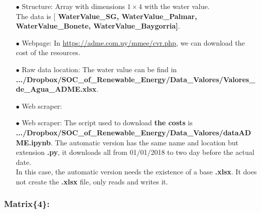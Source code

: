 \documentclass[12pt]{article}
\theoremstyle{definition}
\theoremstyle{remark}
\begin{document}
\begin{enumerate}

\item[$\bullet$] Structure: Array with dimensions $1\times4$ with the water value.\\
The data is [\textbf{{\color{blue} WaterValue\_SG, WaterValue\_Palmar, WaterValue\_Bonete, WaterValue\_Baygorria}]}.

\item[$\bullet$] Webpage: In {\color{blue} \url{https://adme.com.uy/mmee/cvr.php}}, we can download the cost of the resources.

\item[$\bullet$] Raw data location: The water value can be find in \textbf{.../Dropbox/SOC\_of\_Renewable\_Energy/Data\_Valores/Valores\_de\_Agua\_ADME.xlsx}.

\item[$\bullet$] Web scraper: \item[$\bullet$] Web scraper: The script used to download \textbf{the costs} is \textbf{.../Dropbox/SOC\_of\_Renewable\_Energy/Data\_Valores/dataADME.ipynb}. The automatic version has the same name and location but extension \textbf{.py}, it downloads all from 01/01/2018 to two day before the actual date.\\
In this case, the automatic version needs the existence of a base \textbf{.xlsx}. It does not create the \textbf{.xlsx} file, only reads and writes it.

\end{enumerate}

\subsubsection{Matrix\{4\}:}
\end{document}
